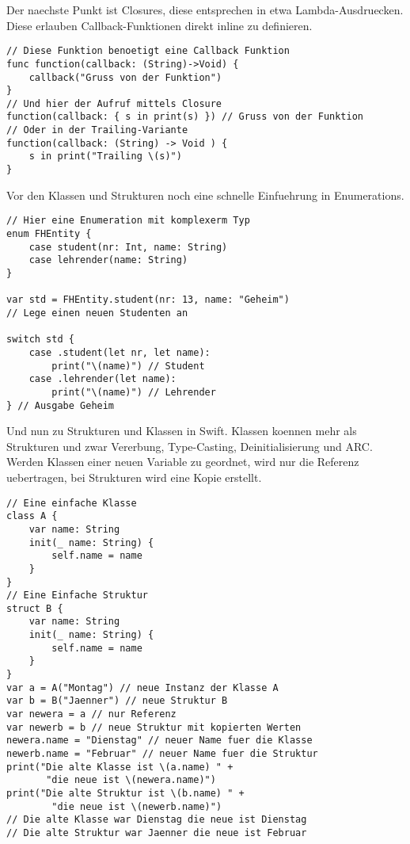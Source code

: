 Der naechste Punkt ist Closures, diese entsprechen in etwa Lambda-Ausdruecken. Diese erlauben Callback-Funktionen direkt inline zu definieren.
\begin{lstlisting}
// Diese Funktion benoetigt eine Callback Funktion
func function(callback: (String)->Void) {
	callback("Gruss von der Funktion")
}
// Und hier der Aufruf mittels Closure
function(callback: { s in print(s) }) // Gruss von der Funktion
// Oder in der Trailing-Variante
function(callback: (String) -> Void ) {
	s in print("Trailing \(s)")
}
\end{lstlisting}
Vor den Klassen und  Strukturen noch eine schnelle Einfuehrung in  Enumerations.
\begin{lstlisting}
// Hier eine Enumeration mit komplexerm Typ
enum FHEntity {
    case student(nr: Int, name: String) 
    case lehrender(name: String)
}

var std = FHEntity.student(nr: 13, name: "Geheim") 
// Lege einen neuen Studenten an

switch std {
    case .student(let nr, let name):
        print("\(name)") // Student
    case .lehrender(let name):
        print("\(name)") // Lehrender
} // Ausgabe Geheim
\end{lstlisting}
Und nun zu Strukturen und Klassen in Swift. Klassen koennen mehr als Strukturen und zwar Vererbung, Type-Casting, Deinitialisierung und ARC. Werden Klassen einer neuen Variable zu geordnet, wird nur die Referenz uebertragen, bei Strukturen wird eine Kopie erstellt.
\begin{lstlisting}
// Eine einfache Klasse
class A {
    var name: String
    init(_ name: String) {
        self.name = name
    }
}
// Eine Einfache Struktur
struct B {
    var name: String
    init(_ name: String) {
        self.name = name
    }
}
var a = A("Montag") // neue Instanz der Klasse A
var b = B("Jaenner") // neue Struktur B
var newera = a // nur Referenz
var newerb = b // neue Struktur mit kopierten Werten
newera.name = "Dienstag" // neuer Name fuer die Klasse
newerb.name = "Februar" // neuer Name fuer die Struktur
print("Die alte Klasse ist \(a.name) " +
       "die neue ist \(newera.name)")
print("Die alte Struktur ist \(b.name) " +
        "die neue ist \(newerb.name)")
// Die alte Klasse war Dienstag die neue ist Dienstag
// Die alte Struktur war Jaenner die neue ist Februar
\end{lstlisting}
